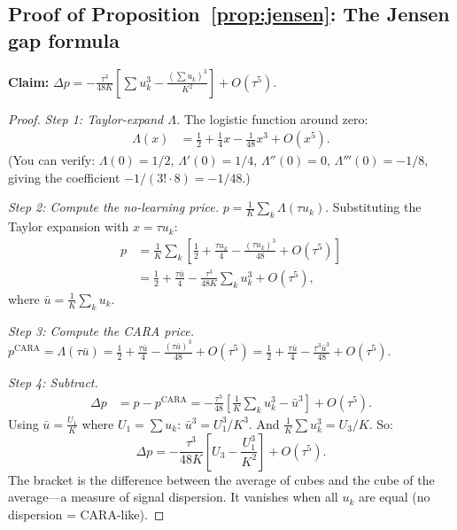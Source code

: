 \documentclass[12pt,letterpaper]{article}
\theoremstyle{definition}
\theoremstyle{remark}
\newcommand{\Lam}{\Lambda}            %
\newcommand{\1}{\mathbf{1}}
\begin{document}
\subsection*{Proof of Proposition~\ref{prop:jensen}: The Jensen gap
formula}

\textbf{Claim:}
$\Delta p = -\frac{\tau^3}{48K}\left[\sum u_k^3 - \frac{(\sum u_k)^3}{K^2}\right] + O(\tau^5)$.

\begin{proof}
\emph{Step 1: Taylor-expand $\Lam$.}
The logistic function around zero:
\begin{align*}
   \Lam(x) &= \frac{1}{2} + \frac{1}{4}x - \frac{1}{48}x^3 + O(x^5).
\end{align*}
(You can verify: $\Lam(0) = 1/2$, $\Lam'(0) = 1/4$, $\Lam''(0) = 0$,
$\Lam'''(0) = -1/8$, giving the coefficient $-1/(3! \cdot 8) = -1/48$.)

\emph{Step 2: Compute the no-learning price.}
$p = \frac{1}{K}\sum_k \Lam(\tau u_k)$. Substituting the Taylor expansion
with $x = \tau u_k$:
\begin{align*}
   p &= \frac{1}{K}\sum_k \left[\frac{1}{2} + \frac{\tau u_k}{4}
        - \frac{(\tau u_k)^3}{48} + O(\tau^5)\right] \\
     &= \frac{1}{2} + \frac{\tau \bar{u}}{4}
        - \frac{\tau^3}{48K}\sum_k u_k^3 + O(\tau^5),
\end{align*}
where $\bar{u} = \frac{1}{K}\sum_k u_k$.

\emph{Step 3: Compute the CARA price.}
$p^{\text{CARA}} = \Lam(\tau \bar{u})
= \frac{1}{2} + \frac{\tau \bar{u}}{4}
  - \frac{(\tau \bar{u})^3}{48} + O(\tau^5)
= \frac{1}{2} + \frac{\tau \bar{u}}{4}
  - \frac{\tau^3 \bar{u}^3}{48} + O(\tau^5)$.

\emph{Step 4: Subtract.}
\begin{align*}
   \Delta p &= p - p^{\text{CARA}}
   = -\frac{\tau^3}{48}\left[\frac{1}{K}\sum_k u_k^3 - \bar{u}^3\right]
     + O(\tau^5).
\end{align*}
Using $\bar{u} = \frac{U_1}{K}$ where $U_1 = \sum u_k$:
$\bar{u}^3 = U_1^3/K^3$. And
$\frac{1}{K}\sum u_k^3 = U_3/K$. So:
\[
   \Delta p = -\frac{\tau^3}{48K}\left[U_3 - \frac{U_1^3}{K^2}\right]
   + O(\tau^5).
\]
The bracket is the difference between the average of cubes and the
cube of the average---a measure of signal dispersion. It vanishes when
all $u_k$ are equal (no dispersion = CARA-like).
\end{proof}
\end{document}
